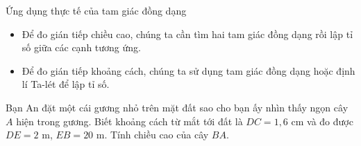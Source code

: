 \begin{dang}{Ứng dụng thực tế của tam giác đồng dạng}
	\begin{itemize}
		\item Để đo gián tiếp chiều cao, chúng ta cần tìm hai tam giác đồng dạng rồi lập tỉ số giữa các cạnh tương ứng.
		\item Để đo gián tiếp khoảng cách, chúng ta sử dụng tam giác đồng dạng hoặc định lí Ta-lét để lập tỉ số.
	\end{itemize}
\end{dang}
\begin{vd}%
	Bạn An đặt một cái gương nhỏ trên mặt đất sao cho bạn ấy nhìn thấy ngọn cây $A$ hiện trong gương. Biết khoảng cách từ mắt tới đất là $DC=1{,}6$ cm và đo được $DE=2$ m, $EB=20$ m. Tính chiều cao của cây $BA$.
\end{vd}

